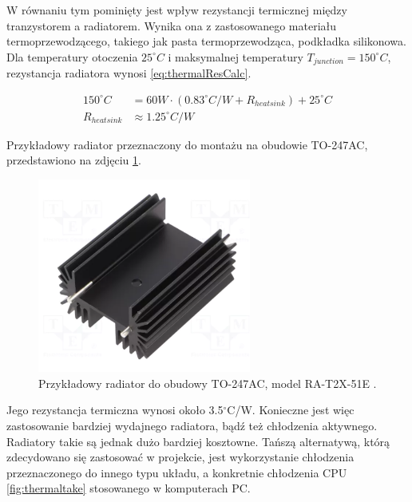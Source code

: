 W równaniu tym pominięty jest wpływ rezystancji termicznej między tranzystorem a radiatorem. Wynika ona z
zastosowanego materiału termoprzewodzącego, takiego jak pasta termoprzewodząca, podkładka silikonowa.
Dla temperatury otoczenia $25^{\circ}C$ i maksymalnej temperatury $T_{junction} = 150^{\circ}C$, rezystancja radiatora wynosi \ref{eq:thermalResCalc}.

\begin{equation}
    \begin{aligned}
        150^{\circ}C &= 60 W \cdot (0.83 ^{\circ}C/W + R_{heatsink}) + 25^{\circ}C \\ 
        R_{heatsink} &\approx 1.25^{\circ}C/W
    \end{aligned}
    \label{eq:thermalResCalc}
\end{equation}

Przykładowy radiator przeznaczony do montażu na obudowie TO-247AC, przedstawiono na zdjęciu \ref{fig:typicalRadiator}.

\begin{figure}[h!]
    \begin{center}
        \includegraphics[width = 7cm]{images/typical_radiator.png}
        \caption{Przykładowy radiator do obudowy TO-247AC, model RA-T2X-51E \cite{RA-T2X-51E}.}
        \label{fig:typicalRadiator}
    \end{center}
\end{figure}

Jego rezystancja termiczna wynosi około 3.5$^{\circ}$C/W. 
Konieczne jest więc zastosowanie bardziej wydajnego radiatora, bądź też chłodzenia aktywnego. Radiatory takie są jednak dużo bardziej kosztowne. 
Tańszą alternatywą, którą zdecydowano się zastosować w projekcie, 
jest wykorzystanie chłodzenia przeznaczonego do innego typu układu, a konkretnie chłodzenia CPU \ref{fig:thermaltake} stosowanego w komputerach PC.

